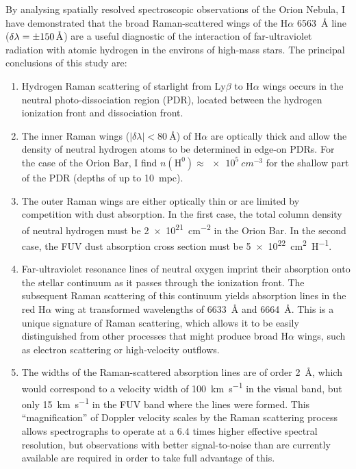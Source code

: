 \documentclass[useAMS, usenatbib, a4paper]{mnras}
\newcounter{ionstage}
\renewcommand{\ion}[2]{\setcounter{ionstage}{#2}%
  \ensuremath{\mathrm{#1\,\scriptstyle\Roman{ionstage}}}}
\def\th#1#2{\ensuremath{\theta^{#1}\,\text{Ori~#2}}}
\newcommand*\chem[1]{\ensuremath{\mathrm{#1}}}
\newcommand\ha{\ensuremath{\text{H}\alpha}}
\newcommand\lyb{\ensuremath{\text{Ly}\beta}}
\begin{document}
By analysing spatially resolved spectroscopic observations  of the Orion Nebula,
I have demonstrated that the broad Raman-scattered wings
of the \ha{} \SI{6563}{\angstrom} line
(\(\delta \lambda = \SI{\pm 150}{\angstrom}\))
are a useful diagnostic of the interaction of far-ultraviolet radiation with
atomic hydrogen in the environs of high-mass stars.
The principal conclusions of this study are:
\begin{enumerate}[1.]
\item Hydrogen Raman scattering of starlight from \lyb{} to \ha{} wings
  occurs in the neutral photo-dissociation region (PDR),
  located between the hydrogen ionization front and dissociation front.  
\item The inner Raman wings (\(|\delta \lambda | < \SI{80}{\angstrom}\)) of \ha{}
  are optically thick and allow
  the density of neutral hydrogen atoms to be determined in edge-on PDRs.
  For the case of the Orion Bar, I find \(n(\chem{H^0}) \approx \SI{e5}{cm^{-3}}\)
  for the shallow part of the PDR (depths of up to \SI{10}{mpc}).
\item The outer Raman wings are either optically thin or are limited by
  competition with dust absorption.
  In the first case, the total column density of neutral hydrogen must be 
  \SI{2e21}{cm^{-2}} in the Orion Bar.
  In the second case, the FUV dust absorption cross section must be
  \SI{5e22}{cm^{2}.H^{-1}}.
\item Far-ultraviolet resonance lines of neutral oxygen imprint their absorption
  onto the stellar continuum as it passes through the ionization front.
  The subsequent Raman scattering of this continuum yields absorption lines
  in the red \ha{} wing
  at transformed wavelengths of \SI{6633}{\angstrom} and \SI{6664}{\angstrom}.
  This is a unique signature of Raman scattering, which allows it
  to be easily distinguished from other processes that might produce broad \ha{} wings,
  such as electron scattering or high-velocity outflows.
\item
  The widths of the Raman-scattered absorption lines are of order \SI{2}{\AA},
  which would correspond to a velocity width of \SI{100}{km.s^{-1}} in the visual band,
  but only \SI{15}{km.s^{-1}} in the FUV band where the lines were formed.
  This ``magnification'' of Doppler velocity scales by the Raman scattering process
  allows spectrographs to operate at a \(6.4\) times higher effective spectral resolution,
  but observations with better signal-to-noise 
  than are currently available are required in order to take full advantage of this.
\end{enumerate}
\end{document}
